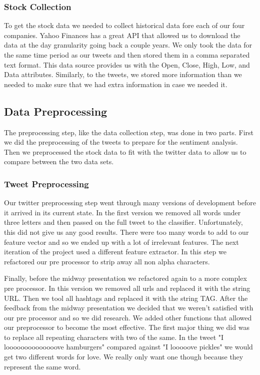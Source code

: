 \documentclass{acm_proc_article-sp}
\begin{document}
\inputminted{python}{examples/streaming.py}

\subsubsection{Stock Collection} 

To get the stock data we needed to collect historical data fore each of our
four companies. Yahoo Finances has a great API that allowed us to download the
data at the day granularity going back a couple years. We only took the data
for the same time period as our tweets and then stored them in a comma
separated text format.  This data source provides us with the Open, Close,
High, Low, and Data attributes. Similarly, to the tweets, we stored more
information than we needed to make sure that we had extra information in case
we needed it. 

\subsection{Data Preprocessing}

The preprocessing step, like the data collection step, was done in two parts.
First we did the preprocessing of the tweets to prepare for the sentiment analysis.
Then we preprocessed the stock data to fit with the twitter data to allow us to 
compare between the two data sets.

\subsubsection{Tweet Preprocessing}

Our twitter preprocessing step went through many versions of development before
it arrived in its current state. In the first version we removed all words
under three letters and then passed on the full tweet to the classifier.
Unfortunately, this did not give us any good results. There were too many words
to add to our feature vector and so we ended up with a lot of irrelevant
features. The next iteration of the project used a different feature extractor.
In this step we refactored our pre processor to strip away all non alpha
characters. 

Finally, before the midway presentation we refactored again to a
more complex pre processor. In this version we removed all urls and replaced it
with the string URL. Then we tool all hashtags and replaced it with the string
TAG. After the feedback from the midway presentation we decided that we weren't
satisfied with our pre processor and so we did research. We added other
functions that allowed our preprocessor to become the most effective. The first
major thing we did was to replace all repeating characters with two of the same.
In the tweet "I loooooooooooooove hamburgers" compared against "I looooove
pickles" we would get two different words for love. We really only want one
though because they represent the same word. 
\end{document}
